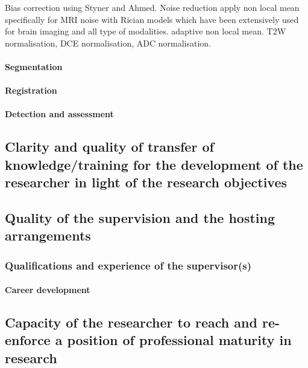 Bias correction using Styner and Ahmed.
Noise reduction apply non local mean specifically for MRI noise with Rician models which have been extensively used for brain imaging and all type of modalities. adaptive non local mean.
T2W normalisation, DCE normalisation, ADC normalisation.

\paragraph{Segmentation}

\paragraph{Registration}

\paragraph{Detection and assessment}

\subsection{Clarity and quality of transfer of knowledge/training for the development of the researcher in light of the research objectives}
\label{sec:transfer}


\subsection{Quality of the supervision and the hosting arrangements}
\label{sec:supervision}

\subsubsection*{Qualifications and experience of the supervisor(s)}


\paragraph{Career development}

\subsection{Capacity of the researcher to reach and re-enforce a position of professional maturity in research}
\label{sec:maturity}
